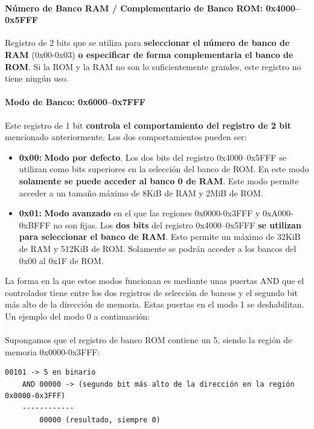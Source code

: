 \paragraph{Número de Banco RAM / Complementario de Banco ROM: 0x4000–0x5FFF} Registro de 2 bits que se utiliza para \textbf{seleccionar el número de banco de RAM} (0x00-0x03) \textbf{o especificar de forma complementaria el banco de ROM}. Si la ROM y la RAM no son lo suficientemente grandes, este registro no tiene ningún uso.

\paragraph{Modo de Banco: 0x6000–0x7FFF} Este registro de 1 bit \textbf{controla el comportamiento del registro de 2 bit} mencionado anteriormente. Los dos comportamientos pueden ser:

\begin{itemize}
    \item \textbf{0x00:} \textbf{Modo por defecto}. Los dos bits del registro 0x4000–0x5FFF se utilizan como bits superiores en la selección del banco de ROM. En este modo \textbf{solamente se puede acceder al banco 0 de RAM}. Este modo permite acceder a un tamaño máximo de 8KiB de RAM y 2MiB de ROM.
    \item \textbf{0x01:} \textbf{Modo avanzado} en el que las regiones 0x0000-0x3FFF y 0xA000-0xBFFF no son fijas. Los \textbf{dos bits} del registro 0x4000–0x5FFF \textbf{se utilizan para seleccionar el banco de RAM}. Esto permite un máximo de 32KiB de RAM y 512KiB de ROM. Solamente se podrán acceder a los bancos del 0x00 al 0x1F de ROM.
\end{itemize}

La forma en la que estos modos funcionan es mediante unas puertas AND que el controlador tiene entre los dos registros de selección de bancos y el segundo bit más alto de la dirección de memoria. Estas puertas en el modo 1 se deshabilitan. Un ejemplo del modo 0 a continuación:
\\\\
Supongamos que el registro de banco ROM contiene un 5, siendo la región de memoria 0x0000-0x3FFF:

\begin{lstlisting}[language=Consola, caption={Selección del banco de ROM en modo 0.}, label={code:bigromselectbankmode0}]
        00101 -> 5 en binario
    AND 00000 -> (segundo bit más alto de la dirección en la región 0x0000-0x3FFF)
    ------------
        00000 (resultado, siempre 0)
\end{lstlisting}


